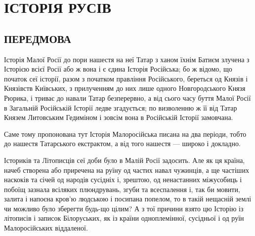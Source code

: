  
 
 
 
 

\chapter{ІСТОРІЯ РУСІВ}


\section{ПЕРЕДМОВА}


Історія Малої Росії до пори нашестя на неї Татар з ханом їхнім Батиєм злучена з
Історією всієї Росії або ж вона і є єдина Історія Російська; бо ж відомо, що
початок сеї історії, разом з початком правління Російського, береться од Князів
і Князівств Київських, з прилученням до них лише одного Новгородського Князя
Рюрика, і триває до навали Татар безперервно, а від сього часу буття Малої
Росії в Загальній Російській Історії ледве згадується; по визволенню ж її від
Татар Князем Литовським Гедиміном і зовсім вона в Російській Історії замовчана.

Саме тому пропонована тут Історія Малоросійська писана на два періоди, тобто до
нашестя Татарського екстрактом, а від того нашестя — широко і докладно.

Істориків та Літописців сеї доби було в Малій Росії задосить. Але як ця країна,
начеб створена або приречена на руїну од частих навал чужинців, а ще частіших
наскоків та січей од народів сусідніх і, зрештою, од ненастанних міжусобиць і
побоїщ зазнала всіляких плюндрувань, згуби та всеспалення і, так би мовити,
залита і напоєна кров'ю людською і посипана попелом, то в такій нещасній землі
чи можливо було зберегти будь-що цілим? А з тої причини взято цю Історію із
літописів і записок Білоруських, як із країни одноплемінної, сусідньої і од
руїн Малоросійських віддаленої.

